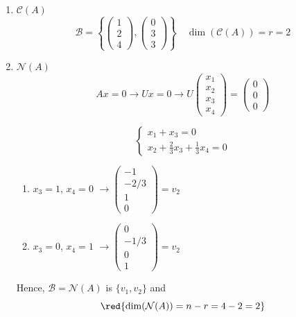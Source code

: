 \begin{enumerate}[label=$\arabic*^\circ$]
    \item $\mathcal{C}(A)$
        \[
            \mathcal{B} = \left\{
                \begin{pmatrix}
                    1 \\ 2 \\ 4
                \end{pmatrix},
                \begin{pmatrix}
                    0 \\ 3 \\ 3
                \end{pmatrix}
            \right\} \quad \dim(\mathcal{C}(A)) = r = 2
        \]

    \item $\mathcal{N}(A)$
    \[
        Ax = 0 \longrightarrow Ux = 0 \longrightarrow U \begin{pmatrix}
            x_1 \\ x_2 \\ x_3 \\ x_4
        \end{pmatrix} = \begin{pmatrix}
            0 \\ 0 \\ 0
        \end{pmatrix}
    \]
    
    \[
        \begin{cases}
            x_1 + x_3 = 0 \\
            x_2 + \frac{2}{3} x_3 + \frac{1}{3} x_4 = 0
        \end{cases}
    \]
    \begin{enumerate}[label=(\alph*)]
        \item $x_3 = 1$, $x_4 = 0$ $\longrightarrow \begin{pmatrix}
            -1 \\ -2/3 \\ 1 \\ 0
        \end{pmatrix} = v_2$
        \item $x_3 = 0$, $x_4 = 1$ $\longrightarrow \begin{pmatrix}
            0 \\ -1/3 \\ 0 \\ 1
        \end{pmatrix} = v_2$
    \end{enumerate}
    Hence, $\mathcal{B} = \mathcal{N}(A)$ is $\{v_1, v_2\}$ and $$\red{\dim(\mathcal{N}(A)) = n - r = 4 - 2 = 2}$$


\end{enumerate}
